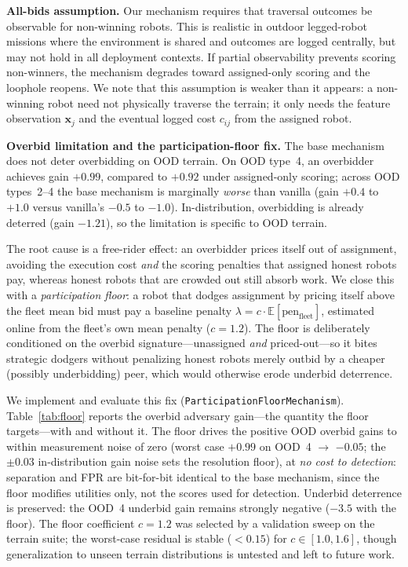 \documentclass[letterpaper, 10pt, conference]{ieeeconf}
\begin{document}
\textbf{All-bids assumption.}
Our mechanism requires that traversal outcomes be observable for non-winning
robots.  This is realistic in outdoor legged-robot missions where the
environment is shared and outcomes are logged centrally, but may not hold in
all deployment contexts.  If partial observability prevents scoring non-winners,
the mechanism degrades toward assigned-only scoring and the loophole reopens.
We note that this assumption is weaker than it appears: a non-winning robot need
not physically traverse the terrain; it only needs the feature observation
$\mathbf{x}_j$ and the eventual logged cost $c_{ij}$ from the assigned robot.

\textbf{Overbid limitation and the participation-floor fix.}
The base mechanism does not deter overbidding on OOD terrain.  On OOD type~4,
an overbidder achieves gain $+0.99$, compared to $+0.92$ under assigned-only
scoring; across OOD types~2--4 the base mechanism is marginally \emph{worse}
than vanilla (gain $+0.4$ to $+1.0$ versus vanilla's $-0.5$ to $-1.0$).
In-distribution, overbidding is already deterred (gain $-1.21$), so the
limitation is specific to OOD terrain.

The root cause is a free-rider effect: an overbidder prices itself out of
assignment, avoiding the execution cost \emph{and} the scoring penalties that
assigned honest robots pay, whereas honest robots that are crowded out still
absorb work.  We close this with a \emph{participation floor}: a robot that
dodges assignment by pricing itself above the fleet mean bid must pay a baseline
penalty $\lambda = c\cdot\mathbb{E}[\text{pen}_\text{fleet}]$, estimated online
from the fleet's own mean penalty ($c=1.2$).  The floor is deliberately
conditioned on the overbid signature---unassigned \emph{and} priced-out---so it
bites strategic dodgers without penalizing honest robots merely outbid by a
cheaper (possibly underbidding) peer, which would otherwise erode underbid
deterrence.

We implement and evaluate this fix (\texttt{ParticipationFloorMechanism}).
Table~\ref{tab:floor} reports the overbid adversary gain---the quantity the
floor targets---with and without it.  The floor drives the positive OOD overbid
gains to within measurement noise of zero (worst case $+0.99$ on OOD~4 $\to$
$-0.05$; the $\pm0.03$ in-distribution gain noise sets the resolution floor),
at \emph{no cost to detection}: separation and FPR are bit-for-bit identical to
the base mechanism, since the floor modifies utilities only, not the scores used
for detection.  Underbid deterrence is preserved: the OOD~4 underbid gain
remains strongly negative ($-3.5$ with the floor).  The floor coefficient
$c=1.2$ was selected by a validation sweep on the terrain suite; the worst-case
residual is stable ($<0.15$) for $c\in[1.0,1.6]$, though generalization to
unseen terrain distributions is untested and left to future work.
\end{document}

